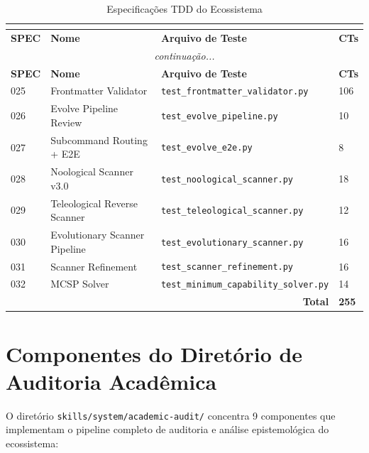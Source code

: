 \begin{longtable}{p{2cm}p{5cm}p{5cm}p{2cm}}
\caption{Especificações TDD do Ecossistema}\\
\label{tab:specs-tdd}\\
\toprule
\textbf{SPEC} & \textbf{Nome} & \textbf{Arquivo de Teste} & \textbf{CTs} \\
\midrule
\endfirsthead
\multicolumn{4}{c}{\textit{continuação...}} \\
\toprule
\textbf{SPEC} & \textbf{Nome} & \textbf{Arquivo de Teste} & \textbf{CTs} \\
\midrule
\endhead
025 & Frontmatter Validator & \texttt{test\_frontmatter\_validator.py} & 106 \\
026 & Evolve Pipeline Review & \texttt{test\_evolve\_pipeline.py} & 10 \\
027 & Subcommand Routing + E2E & \texttt{test\_evolve\_e2e.py} & 8 \\
028 & Noological Scanner v3.0 & \texttt{test\_noological\_scanner.py} & 18 \\
029 & Teleological Reverse Scanner & \texttt{test\_teleological\_scanner.py} & 12 \\
030 & Evolutionary Scanner Pipeline & \texttt{test\_evolutionary\_scanner.py} & 16 \\
031 & Scanner Refinement & \texttt{test\_scanner\_refinement.py} & 16 \\
032 & MCSP Solver & \texttt{test\_minimum\_capability\_solver.py} & 14 \\
\bottomrule
\multicolumn{3}{r}{\textbf{Total}} & \textbf{255} \\
\end{longtable}

\section{Componentes do Diretório de Auditoria Acadêmica}

O diretório \texttt{skills/system/academic-audit/} concentra 9 componentes que implementam o pipeline completo de auditoria e análise epistemológica do ecossistema:

